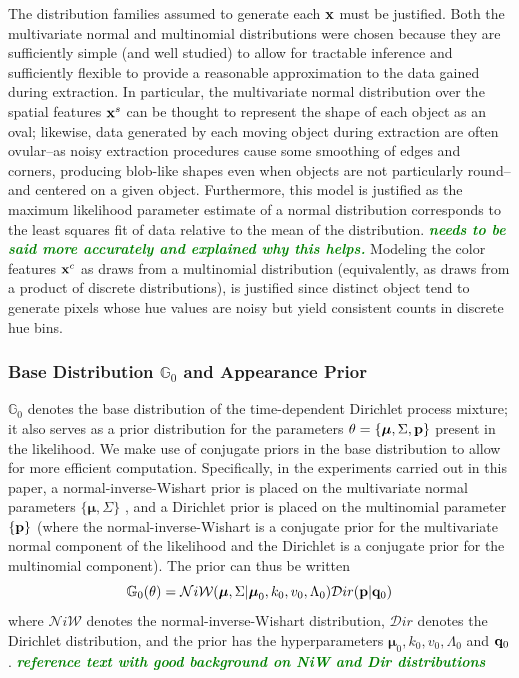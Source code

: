 \documentclass{article}
\newcommand{\willie}[1]{\textcolor{green}{\textsf{\emph{\textbf{\textcolor{green}{#1}}}}}}
\begin{document}
The distribution families assumed to generate each $\bold{x}$ must be justified. Both the multivariate normal and multinomial distributions were chosen because they are sufficiently simple (and well studied) to allow for tractable inference and sufficiently flexible to provide a reasonable approximation to the data gained during extraction. In particular, the multivariate normal distribution over the spatial features $\bold{x}^{s}$ can be thought to represent the shape of each object as an oval; likewise, data generated by each moving object during extraction are often ovular--as noisy extraction procedures cause some smoothing of edges and corners, producing blob-like shapes even when objects are not particularly round--and centered on a given object. Furthermore, this model is justified as the maximum likelihood parameter estimate of a normal distribution corresponds to the least squares fit of data relative to the mean of the distribution. \willie{needs to be said more accurately and explained why this helps.} Modeling the color features $\bold{x}^{c}$ as draws from a multinomial distribution (equivalently, as draws from a product of discrete distributions), is justified since distinct object tend to generate pixels whose hue values are noisy but yield consistent counts in discrete hue bins.



\subsubsection{Base Distribution $\mathbb{G}_{0}$ and Appearance Prior}

$\mathbb{G}_{0}$ denotes the base distribution of the time-dependent Dirichlet process mixture; it also serves as a prior distribution for the parameters $\theta = \{ \boldsymbol{\mu}, \Sigma, \bold{p} \}$ present in the likelihood. We make use of conjugate priors in the base distribution to allow for more efficient computation. Specifically, in the experiments carried out in this paper, a normal-inverse-Wishart prior is placed on the multivariate normal parameters $\{ \boldsymbol{\mu}, \Sigma \}$ , and a Dirichlet prior is placed on the multinomial parameter $ \{  \bold{p}  \} $ (where the normal-inverse-Wishart is a conjugate prior for the multivariate normal component of the likelihood and the Dirichlet is a conjugate prior for the multinomial component). The prior can thus be written
\begin{equation}
\mathbb{G}_{0}(\theta) = \mathcal{N}i\mathcal{W}(\boldsymbol{\mu}, \Sigma | \boldsymbol{\mu}_{0}, k_{0}, v_{0}, \Lambda_{0})  \mathcal{D}ir( \bold{p} | \bold{q}_{0})
\end{equation}
where $\mathcal{N}i\mathcal{W}$ denotes the normal-inverse-Wishart distribution, $\mathcal{D}ir$ denotes the Dirichlet distribution, and the prior has the hyperparameters $\boldsymbol{\mu}_{0}, k_{0}, v_{0}, \Lambda_{0}$ and $\bold{q}_{0}$.  \willie{reference text with good background on NiW and Dir distributions}
\end{document}
